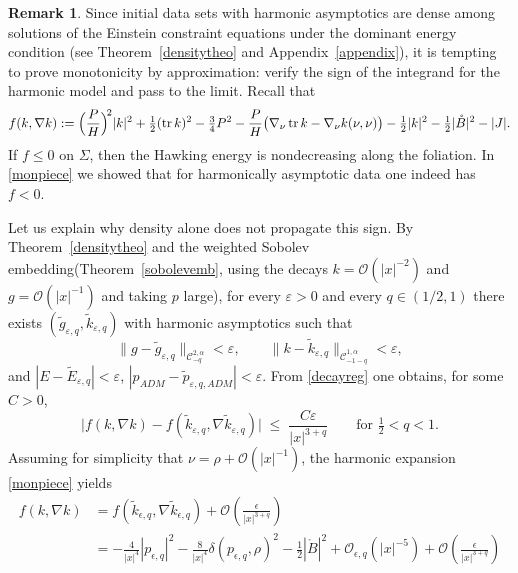 \documentclass[12pt,a4paper]{amsart}
\theoremstyle{plain}
\theoremstyle{definition}
\newtheorem{remark}[theorem]{Remark}
\newcommand{\tr}{\operatorname{tr}}
\begin{document}
\begin{remark}
Since initial data sets with harmonic asymptotics are dense among solutions of the Einstein constraint equations under the dominant energy condition (see Theorem~\ref{densitytheo} and Appendix~\ref{appendix}), it is tempting to prove monotonicity by approximation: verify the sign of the integrand for the harmonic model and pass to the limit. Recall that
\[
f(k,\nabla k)
:=\Bigl(\frac{P}{H}\Bigr)^{\!2}|k|^2
+\tfrac12(\tr k)^2
-\tfrac34 P^2
-\frac{P}{H}\bigl(\nabla_\nu \tr k-\nabla_\nu k(\nu,\nu)\bigr)
-\tfrac12|k|^2
-\tfrac12|\mathring B|^2
-|J|.
\]
If \(f\le0\) on \(\Sigma\), then the Hawking energy is nondecreasing along the foliation. In \eqref{monpiece} we showed that for harmonically asymptotic data one indeed has \(f<0\).

Let us explain why density alone does not propagate this sign. By Theorem~\ref{densitytheo} and the weighted Sobolev embedding(Theorem~\ref{sobolevemb}, using the decays \(k=\mathcal O(|x|^{-2})\) and \(g=\mathcal O(|x|^{-1})\) and taking \(p\) large), for every \(\varepsilon>0\) and every \(q\in(1/2,1)\) there exists \((\tilde g_{\varepsilon,q},\tilde k_{\varepsilon,q})\) with harmonic asymptotics such that
\begin{equation}\label{decayreg}
\|g-\tilde g_{\varepsilon,q}\|_{\mathcal C^{2,\alpha}_{-q}}<\varepsilon,
\qquad
\|k-\tilde k_{\varepsilon,q}\|_{\mathcal C^{1,\alpha}_{-1-q}}<\varepsilon,
\end{equation}
and \(|E-\tilde E_{\varepsilon,q}|<\varepsilon\), \(|p_{ADM}-\tilde p_{\varepsilon,q,ADM}|<\varepsilon\). From \eqref{decayreg} one obtains, for some \(C>0\),
\[
\bigl|f(k,\nabla k)-f(\tilde k_{\varepsilon,q},\nabla\tilde k_{\varepsilon,q})\bigr|
\;\le\; \frac{C\varepsilon}{|x|^{3+q}}
\qquad\text{for } \tfrac12<q<1.
\]
Assuming for simplicity that \(\nu=\rho+\mathcal{O}(|x|^{-1})\), the harmonic expansion \eqref{monpiece} yields
\begin{equation}
    \begin{split}
        f(k,\nabla k) &=f(\tilde{k}_{\epsilon,q},\nabla \tilde{k}_{\epsilon,q})  + \mathcal{O}(\frac{  \epsilon}{|x|^{3+q}})\\
        &=  -\frac{4}{|x|^4}|p_{\epsilon,q}|^2 -\frac{8}{|x|^4}  \delta( p_{\epsilon,q}, \rho )^2 -\frac{1}{2} |\mathring{B}|^2 +\mathcal{O}_{\epsilon,q} ( |x|^{-5}) + \mathcal{O}(\frac{  \epsilon}{|x|^{3+q}})
    \end{split}
\end{equation}

\end{remark}
\end{document}
